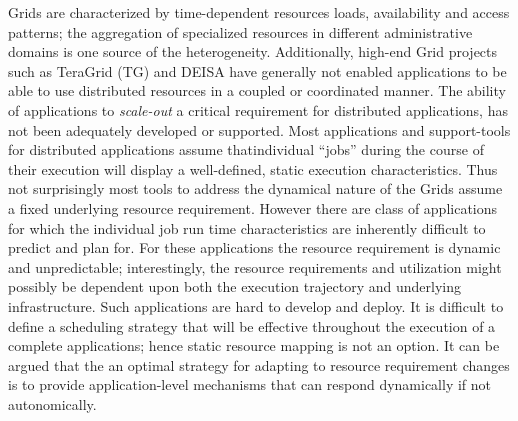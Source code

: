 \documentclass{sig-alternate}
\newcommand{\jhanote}[1]{ {\textcolor{red} { ***Jha: #1 }}}
\newcommand{\yyenote}[1]{ {\textcolor{blue} { ***yye00: #1 }}}
\newcommand{\jhanote}[1]{}
\newcommand{\yyenote}[1]{}
\begin{document}

Grids are characterized by time-dependent resources loads, availability and access patterns; the aggregation of specialized resources in different administrative domains is one source of the heterogeneity.  Additionally, high-end Grid projects such as TeraGrid (TG) and DEISA have generally not enabled applications to be able to use distributed resources in a coupled or coordinated manner. The ability of applications to {\it scale-out} a critical requirement for distributed applications, has not been adequately developed or supported. %
Most applications and support-tools for distributed applications assume thatindividual ``jobs'' during the course of their execution will display a well-defined, static execution characteristics.  Thus not surprisingly most tools to address the dynamical nature of the Grids assume a fixed underlying resource requirement.  However there are class of applications for which the individual job run time characteristics are inherently difficult to predict and plan for. For these applications the resource requirement is dynamic and unpredictable; interestingly, the resource requirements and utilization might possibly be dependent upon both the execution trajectory and underlying infrastructure. Such applications are hard to develop and deploy. It is difficult to define a scheduling strategy that will be effective throughout the execution of a complete applications; hence static resource mapping is not an option.  It can be argued that the an optimal strategy for adapting to resource requirement changes is to provide application-level mechanisms that can respond dynamically if not autonomically.

\end{document}
